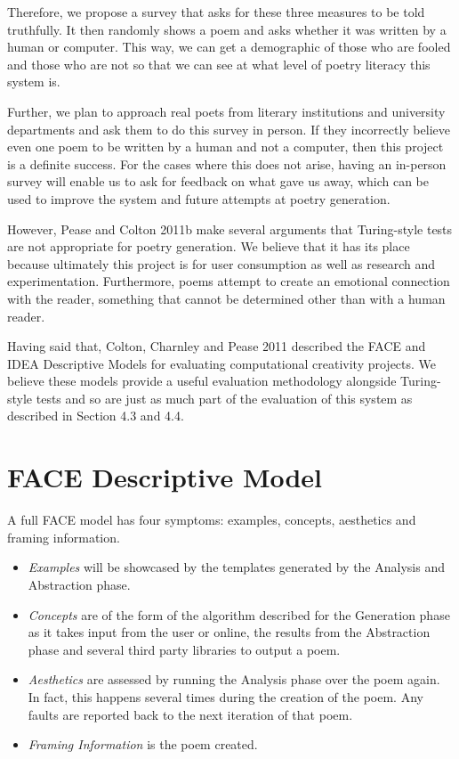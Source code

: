 Therefore, we propose a survey that asks for these three measures to be told truthfully. It then randomly shows a poem and asks whether it was written by a human or computer. This way, we can get a demographic of those who are fooled and those who are not so that we can see at what level of poetry literacy this system is.

Further, we plan to approach real poets from literary institutions and university departments and ask them to do this survey in person. If they incorrectly believe even one poem to be written by a human and not a computer, then this project is a definite success. For the cases where this does not arise, having an in-person survey will enable us to ask for feedback on what gave us away, which can be used to improve the system and future attempts at poetry generation.

However, Pease and Colton 2011b make several arguments that Turing-style tests are not appropriate for poetry generation. We believe that it has its place because ultimately this project is for user consumption as well as research and experimentation. Furthermore, poems attempt to create an emotional connection with the reader, something that cannot be determined other than with a human reader.

Having said that, Colton, Charnley and Pease 2011 described the FACE and IDEA Descriptive Models for evaluating computational creativity projects. We believe these models provide a useful evaluation methodology alongside Turing-style tests and so are just as much part of the evaluation of this system as described in Section 4.3 and 4.4.

\section{FACE Descriptive Model}
A full FACE model has four symptoms: examples, concepts, aesthetics and framing information.

\begin{itemize}
\setlength{\itemsep}{0pt}
\item{\emph{Examples} will be showcased by the templates generated by the Analysis and Abstraction phase.}
\item{\emph{Concepts} are of the form of the algorithm described for the Generation phase as it takes input from the user or online, the results from the Abstraction phase and several third party libraries to output a poem.}
\item{\emph{Aesthetics} are assessed by running the Analysis phase over the poem again. In fact, this happens several times during the creation of the poem. Any faults are reported back to the next iteration of that poem.}
\item{\emph{Framing Information} is the poem created.}
\end{itemize}

